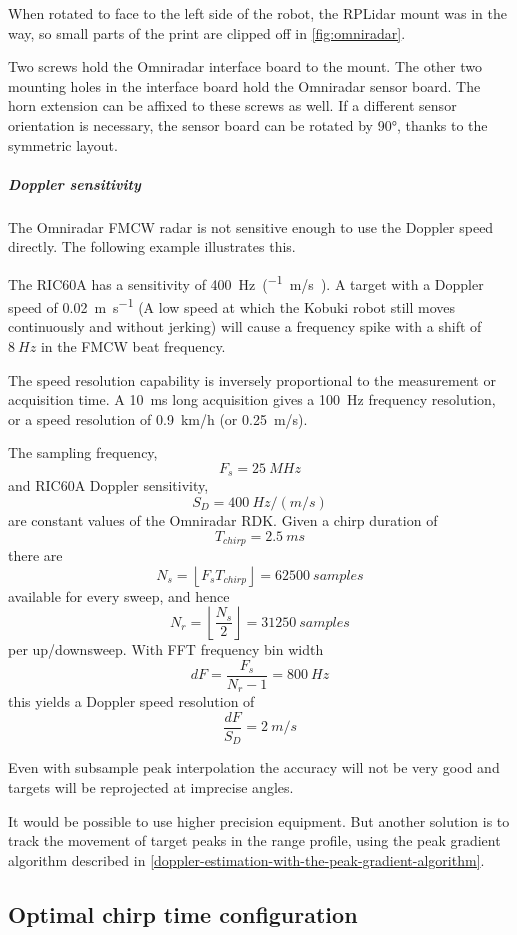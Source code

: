 When rotated to face to the left side of the robot, the RPLidar mount
was in the way, so small parts of the print are clipped off in \cref{fig:omniradar}.

Two screws hold the Omniradar interface board to the mount. The other
two mounting holes in the interface board hold the Omniradar sensor
board. The horn extension can be affixed to these screws as well. If a
different sensor orientation is necessary, the sensor board can be
rotated by \ang{90}, thanks to the symmetric layout.

\subparagraph{Doppler sensitivity}\label{doppler-sensitivity}

The Omniradar FMCW radar is not sensitive enough to use the Doppler
speed directly. The following example illustrates this.

The RIC60A has a sensitivity of \SI{400}{Hz\per(m/s)}. A target with a
Doppler speed of \SI{0.02}{m\per s} (A low speed at which the Kobuki robot
still moves continuously and without jerking) will cause a frequency
spike with a shift of \(\SI{8}{Hz}\) in the FMCW beat frequency.

The speed resolution capability is inversely proportional to the
measurement or acquisition time. A \SI{10}{ms} long acquisition gives a \SI{100}{Hz}
frequency resolution, or a speed resolution of \SI{0.9}{km/h} (or \SI{0.25}{m/s}).

The sampling frequency,
\[
    F_s=\SI{25}{MHz}
\]
and RIC60A Doppler sensitivity,
\[
    S_D = \SI{400}{Hz\per(m/s)}
\]
are constant values of the Omniradar RDK. Given a chirp duration of
\[
    T_{chirp} = \SI{2.5}{ms}
\]
there are
\[
    N_s = \left\lfloor F_s T_{chirp} \right\rfloor = \SI{62500}{samples}
\]
available for every sweep, and hence
\[
    N_r = \left\lfloor \frac{N_s}{2} \right\rfloor = \SI{31250}{samples}
\]
per up/downsweep. With FFT frequency bin width
\[
    dF = \frac{F_s}{N_r - 1} = \SI{800}{Hz}
\]
this yields a Doppler speed resolution of
\[
\frac{dF}{S_D} = \SI{2}{m/s}
\]

Even with subsample peak interpolation the accuracy will not be very
good and targets will be reprojected at imprecise angles.

It would be possible to use higher precision equipment. But another
solution is to track the movement of target peaks in the range profile,
using the peak gradient algorithm described in \cref{doppler-estimation-with-the-peak-gradient-algorithm}.

\subsection{Optimal chirp time configuration} \label{optimal-chirp-time-configuration}

